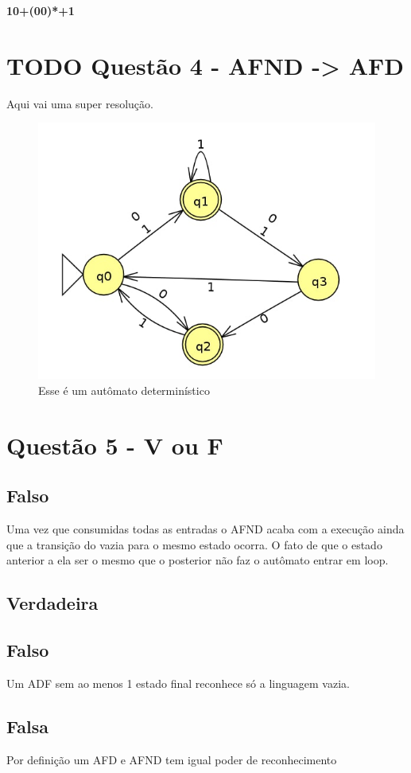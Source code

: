 \documentclass[11pt]{article}
\begin{document}
\textbf{10+(00)*+1} 
\pagebreak
\section{{\bfseries\sffamily TODO} Questão 4 - AFND -> AFD}
\label{sec:orgb81e8e2}
Aqui vai uma super resolução.
\begin{figure}[htbp]
\centering
\includegraphics[width=.9\linewidth]{./q4/q4.jpg}
\caption{\label{fig:org909fda7}
Esse é um autômato determinístico}
\end{figure}
\pagebreak
\section{Questão 5  - V ou F}
\label{sec:orgd4e3a61}
\subsection{Falso}
\label{sec:org2726acf}
Uma vez que consumidas todas as entradas o AFND acaba com a execução ainda que a transição do vazia para o mesmo estado ocorra.  O fato de que o estado anterior a ela ser o mesmo que o posterior não faz o autômato entrar em loop.
\subsection{Verdadeira}
\label{sec:org9ce3c42}
\subsection{Falso}
\label{sec:org1745221}
Um ADF sem ao menos 1 estado final reconhece só a linguagem vazia.
\subsection{Falsa}
\label{sec:orgebd3a12}
Por definição um AFD e AFND tem igual poder de reconhecimento
\end{document}
